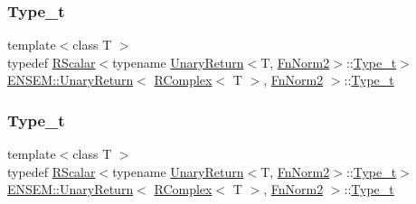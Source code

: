 \subsubsection{\texorpdfstring{Type\_t}{Type\_t}\hspace{0.1cm}{\footnotesize\ttfamily [1/3]}}
{\footnotesize\ttfamily template$<$class T $>$ \\
typedef \mbox{\hyperlink{classENSEM_1_1RScalar}{R\+Scalar}}$<$typename \mbox{\hyperlink{structENSEM_1_1UnaryReturn}{Unary\+Return}}$<$T, \mbox{\hyperlink{structENSEM_1_1FnNorm2}{Fn\+Norm2}}$>$\+::\mbox{\hyperlink{structENSEM_1_1UnaryReturn_3_01RComplex_3_01T_01_4_00_01FnNorm2_01_4_a6b6070508bed1e14a03db04ab901526a}{Type\+\_\+t}}$>$ \mbox{\hyperlink{structENSEM_1_1UnaryReturn}{E\+N\+S\+E\+M\+::\+Unary\+Return}}$<$ \mbox{\hyperlink{classENSEM_1_1RComplex}{R\+Complex}}$<$ T $>$, \mbox{\hyperlink{structENSEM_1_1FnNorm2}{Fn\+Norm2}} $>$\+::\mbox{\hyperlink{structENSEM_1_1UnaryReturn_3_01RComplex_3_01T_01_4_00_01FnNorm2_01_4_a6b6070508bed1e14a03db04ab901526a}{Type\+\_\+t}}}

\mbox{\label{structENSEM_1_1UnaryReturn_3_01RComplex_3_01T_01_4_00_01FnNorm2_01_4_a6b6070508bed1e14a03db04ab901526a}} 
\subsubsection{\texorpdfstring{Type\_t}{Type\_t}\hspace{0.1cm}{\footnotesize\ttfamily [2/3]}}
{\footnotesize\ttfamily template$<$class T $>$ \\
typedef \mbox{\hyperlink{classENSEM_1_1RScalar}{R\+Scalar}}$<$typename \mbox{\hyperlink{structENSEM_1_1UnaryReturn}{Unary\+Return}}$<$T, \mbox{\hyperlink{structENSEM_1_1FnNorm2}{Fn\+Norm2}}$>$\+::\mbox{\hyperlink{structENSEM_1_1UnaryReturn_3_01RComplex_3_01T_01_4_00_01FnNorm2_01_4_a6b6070508bed1e14a03db04ab901526a}{Type\+\_\+t}}$>$ \mbox{\hyperlink{structENSEM_1_1UnaryReturn}{E\+N\+S\+E\+M\+::\+Unary\+Return}}$<$ \mbox{\hyperlink{classENSEM_1_1RComplex}{R\+Complex}}$<$ T $>$, \mbox{\hyperlink{structENSEM_1_1FnNorm2}{Fn\+Norm2}} $>$\+::\mbox{\hyperlink{structENSEM_1_1UnaryReturn_3_01RComplex_3_01T_01_4_00_01FnNorm2_01_4_a6b6070508bed1e14a03db04ab901526a}{Type\+\_\+t}}}

